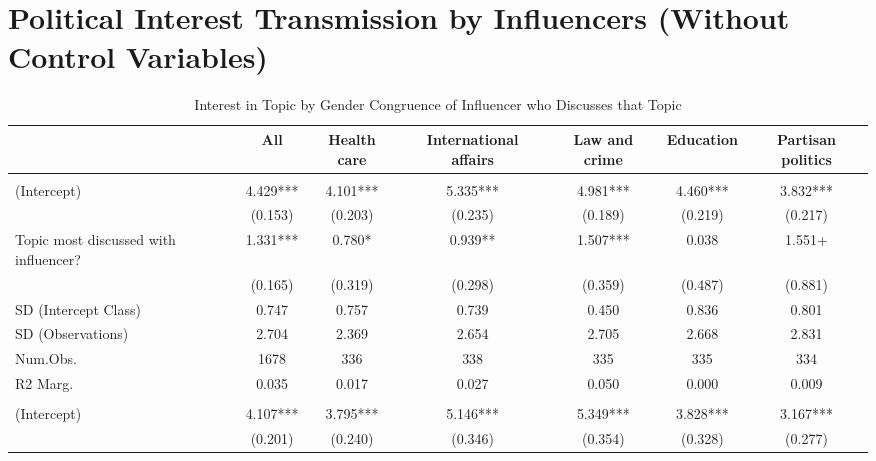 \documentclass[
  letterpaper,
  DIV=11,
  numbers=noendperiod]{scrreprt}
\begin{document}
\chapter{Political Interest Transmission by Influencers (Without Control
Variables)}\label{sec-appendix9}

\begin{table}
\centering\centering
\caption{Interest in Topic by Gender Congruence of Influencer who Discusses that Topic \label{tab:lmeInfluencer}}
\centering
\fontsize{6}{8}\selectfont
\begin{tabular}[t]{lcccccc}
\toprule
  & All & Health care & International affairs & Law and crime & Education & Partisan politics\\
\midrule
\addlinespace[0.5em]
\multicolumn{7}{l}{\textit{Same-Gender Influencers}}\\
\midrule \hspace{1em}(Intercept) & 4.429*** & 4.101*** & 5.335*** & 4.981*** & 4.460*** & 3.832***\\
\hspace{1em} & (0.153) & (0.203) & (0.235) & (0.189) & (0.219) & (0.217)\\
\hspace{1em}Topic most discussed with influencer? & 1.331*** & 0.780* & 0.939** & 1.507*** & 0.038 & 1.551+\\
\hspace{1em} & (0.165) & (0.319) & (0.298) & (0.359) & (0.487) & (0.881)\\
\hspace{1em}SD (Intercept Class) & 0.747 & 0.757 & 0.739 & 0.450 & 0.836 & 0.801\\
\hspace{1em}SD (Observations) & 2.704 & 2.369 & 2.654 & 2.705 & 2.668 & 2.831\\
\hspace{1em}Num.Obs. & 1678 & 336 & 338 & 335 & 335 & 334\\
\hspace{1em}R2 Marg. & 0.035 & 0.017 & 0.027 & 0.050 & 0.000 & 0.009\\
\addlinespace[0.5em]
\multicolumn{7}{l}{\textit{Other-Gender Influencers}}\\
\midrule \hspace{1em}(Intercept) & 4.107*** & 3.795*** & 5.146*** & 5.349*** & 3.828*** & 3.167***\\
\hspace{1em} & (0.201) & (0.240) & (0.346) & (0.354) & (0.328) & (0.277)\\

\end{tabular}
\end{table}
\end{document}
